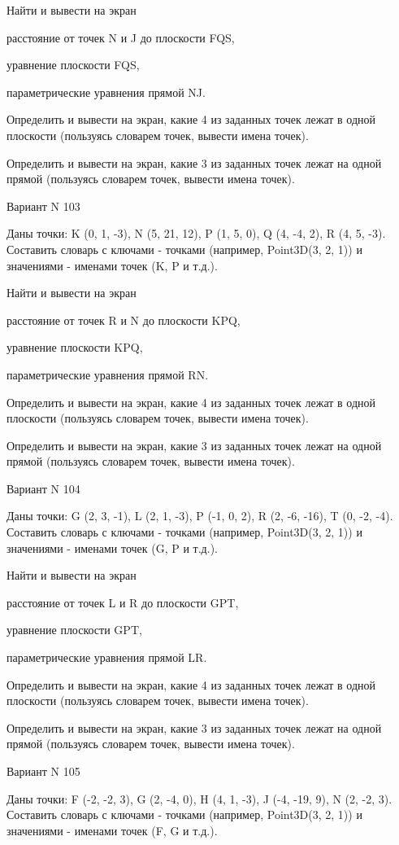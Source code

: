 \documentclass[11pt]{report}
\begin{document}
 
Найти и вывести на экран


расстояние от точек N и J до плоскости FQS,

 
уравнение плоскости FQS,

 
параметрические уравнения прямой NJ.


Определить и вывести на экран, какие 4 из заданных точек лежат в одной плоскости (пользуясь словарем точек, вывести имена точек).


Определить и вывести на экран, какие 3 из заданных точек лежат на одной прямой (пользуясь словарем точек, вывести имена точек).

Вариант N 103

Даны точки: K (0, 1, -3), N (5, 21, 12), P (1, 5, 0), Q (4, -4, 2), R (4, 5, -3).
Составить словарь с ключами - точками (например, Point3D(3, 2, 1)) и значениями - именами точек (K, P и т.д.).

 
Найти и вывести на экран


расстояние от точек R и N до плоскости KPQ,

 
уравнение плоскости KPQ,

 
параметрические уравнения прямой RN.


Определить и вывести на экран, какие 4 из заданных точек лежат в одной плоскости (пользуясь словарем точек, вывести имена точек).


Определить и вывести на экран, какие 3 из заданных точек лежат на одной прямой (пользуясь словарем точек, вывести имена точек).

Вариант N 104

Даны точки: G (2, 3, -1), L (2, 1, -3), P (-1, 0, 2), R (2, -6, -16), T (0, -2, -4).
Составить словарь с ключами - точками (например, Point3D(3, 2, 1)) и значениями - именами точек (G, P и т.д.).

 
Найти и вывести на экран


расстояние от точек L и R до плоскости GPT,

 
уравнение плоскости GPT,

 
параметрические уравнения прямой LR.


Определить и вывести на экран, какие 4 из заданных точек лежат в одной плоскости (пользуясь словарем точек, вывести имена точек).


Определить и вывести на экран, какие 3 из заданных точек лежат на одной прямой (пользуясь словарем точек, вывести имена точек).

Вариант N 105

Даны точки: F (-2, -2, 3), G (2, -4, 0), H (4, 1, -3), J (-4, -19, 9), N (2, -2, 3).
Составить словарь с ключами - точками (например, Point3D(3, 2, 1)) и значениями - именами точек (F, G и т.д.).
\end{document}
